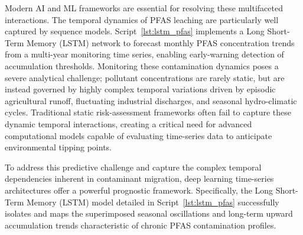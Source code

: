 \documentclass[land,article,submit,pdftex,moreauthors]{Definitions/mdpi}
\begin{document}
Modern AI and ML frameworks
are essential for resolving these multifaceted interactions. The temporal
dynamics of PFAS leaching are particularly well captured by sequence models.
Script~\ref{lst:lstm_pfas} implements a Long Short-Term Memory (LSTM) network
to forecast monthly PFAS concentration trends from a multi-year monitoring
time series, enabling early-warning detection of accumulation thresholds. Monitoring these contamination dynamics poses a severe analytical challenge; pollutant concentrations are rarely static, but are instead governed by highly complex temporal variations driven by episodic agricultural runoff, fluctuating industrial discharges, and seasonal hydro-climatic cycles. Traditional static risk-assessment frameworks often fail to capture these dynamic temporal interactions, creating a critical need for advanced computational models capable of evaluating time-series data to anticipate environmental tipping points.

To address this predictive challenge and capture the complex temporal dependencies inherent in contaminant migration, deep learning time-series architectures offer a powerful prognostic framework. Specifically, the Long Short-Term Memory (LSTM) model detailed in Script~\ref{lst:lstm_pfas} successfully isolates and maps the superimposed seasonal oscillations and long-term upward accumulation trends characteristic of chronic PFAS contamination profiles. 
\end{document}
